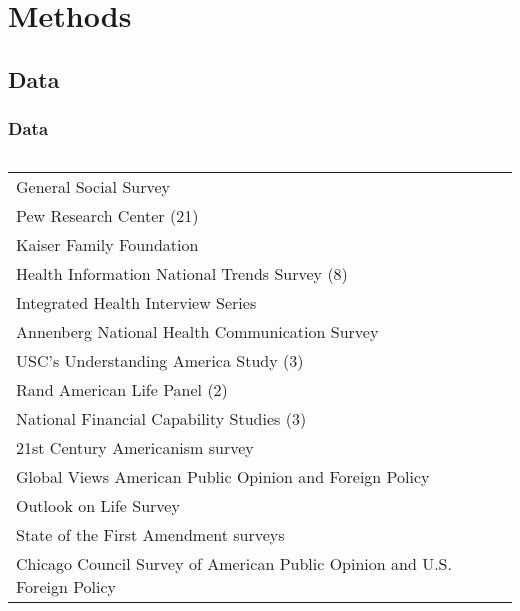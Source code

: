 \documentclass[pdf]{beamer}
\begin{document}
\section{Methods}

\subsection{Data}
\begin{frame}
\frametitle{Data}
  \begin{columns}
      \begin{tabular}{l}  %
        \hline   %
        General Social Survey           \\
        Pew Research Center (21)           \\
        Kaiser Family Foundation        \\
        Health Information National Trends Survey (8) \\
        Integrated Health Interview Series \\
        Annenberg National Health Communication Survey \\
        USC's Understanding America Study (3) \\
        Rand American Life Panel (2)  \\
        National Financial Capability Studies (3) \\
        21st Century Americanism survey \\
        Global Views American Public Opinion and Foreign Policy \\
        Outlook on Life Survey \\
        State of the First Amendment surveys \\
        Chicago Council Survey of American Public Opinion and U.S. Foreign Policy \\
        \hline  %
        \end{tabular}
   \end{columns}
\end{frame}
\end{document}
